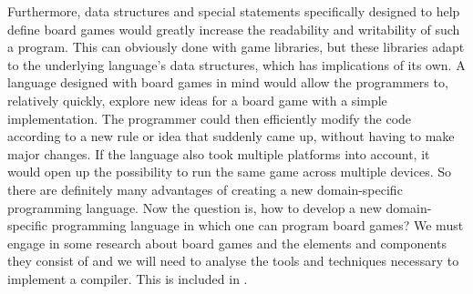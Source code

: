 Furthermore, data structures and special statements specifically
designed to help define board games would greatly increase the
readability and writability of such a program. This can obviously
done with game libraries, but these libraries adapt to the underlying
language's data structures, which has implications of its own. A
language designed with board games in mind would allow the programmers
to, relatively quickly, explore new ideas for a board game with a simple
implementation. The programmer could then efficiently modify the code
according to a new rule or idea that suddenly came up, without having
to make major changes. If the language also took multiple platforms
into account, it would open up the possibility to run the same game
across multiple devices. So there are definitely many advantages of
creating a new domain-specific programming language. Now the question
is, how to develop a new domain-specific programming language in which
one can program board games? We must engage in some research
about board games and the elements and components they consist of and we
will need to analyse the tools and techniques necessary to implement a
compiler. This is included in .
